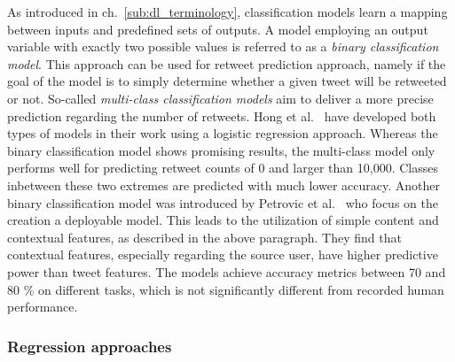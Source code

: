 As introduced in ch.~\ref{sub:dl_terminology}, classification models learn a
mapping between inputs and predefined sets of outputs.
A model employing an output variable with exactly two possible values is referred
to as a \textit{binary classification model}.
This approach can be used for retweet prediction approach, namely if the goal
of the model is to simply determine whether a given tweet will be retweeted
or not.
So-called \textit{multi-class classification models} aim to deliver a more
precise prediction regarding the number of retweets.
Hong et al.~\cite{Hong2011} have developed both types of models in their work
using a logistic regression approach.
Whereas the binary classification model shows promising results, the multi-class
model only performs well for predicting retweet counts of 0 and larger than
10,000.
Classes inbetween these two extremes are predicted with much lower accuracy.
Another binary classification model was introduced by Petrovic et al.~\cite{Petrovic2011}
who focus on the creation a deployable model.
This leads to the utilization of simple content and contextual features, as described
in the above paragraph.
They find that contextual features, especially regarding the source user,
have higher predictive power than tweet features.
The models achieve accuracy metrics between 70 and 80 \% on different tasks,
which is not significantly different from recorded human performance.

\subsubsection{Regression approaches}


